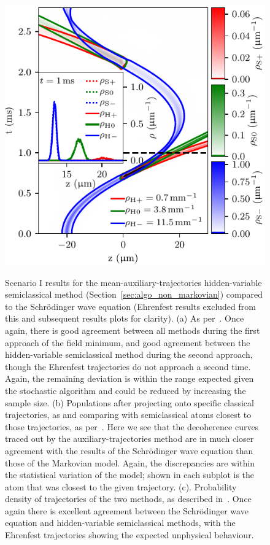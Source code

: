 {\begin{figure}
{    \includegraphics{figures/hidden_variables/hvsc_aux/trajectories.pdf}
    }
    \caption{Scenario I results for the mean-auxiliary-trajectories hidden-variable semiclassical method (Section~\ref{sec:algo_non_markovian}) compared to the Schr\"odinger wave equation (Ehrenfest results excluded from this and subsequent results plots for clarity). (a) As per~. Once again, there is good agreement between all methods during the first approach of the field minimum, and good agreement between the hidden-variable semiclassical method during the second approach, though the Ehrenfest trajectories do not approach a second time. Again, the remaining deviation is within the range expected given the stochastic algorithm and could be reduced by increasing the sample size. (b) Populations after projecting onto specific classical trajectories, as and comparing with semiclassical atoms closest to those trajectories, as per~. Here we see that the decoherence curves traced out by the auxiliary-trajectories method are in much closer agreement with the results of the Schr\"odinger wave equation than those of the Markovian model. Again, the discrepancies are within the statistical variation of the model; shown in each subplot is the atom that was closest to the given trajectory. (c). Probability density of trajectories of the two methods, as described in~. Once again there is excellent agreement between the Schr\"odinger wave equation and hidden-variable semiclassical methods, with the Ehrenfest trajectories showing the expected unphysical behaviour.}\label{fig:scenario_one_aux}
\end{figure}
\restoregeometry}


